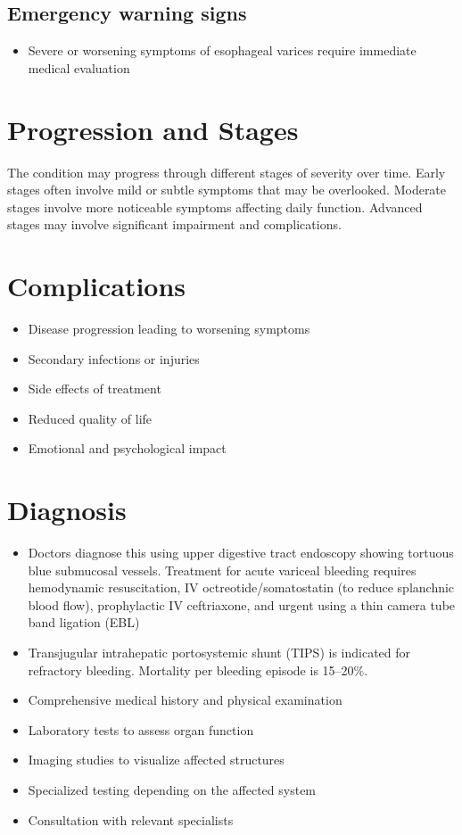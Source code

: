 \subsection{Emergency warning signs}
\begin{itemize}[noitemsep]
  \item Severe or worsening symptoms of esophageal varices require immediate medical evaluation
\end{itemize}
\section{Progression and Stages}
The condition may progress through different stages of severity over time. Early stages often involve mild or subtle symptoms that may be overlooked. Moderate stages involve more noticeable symptoms affecting daily function. Advanced stages may involve significant impairment and complications.
\section{Complications}
\begin{itemize}[noitemsep]
  \item Disease progression leading to worsening symptoms
  \item Secondary infections or injuries
  \item Side effects of treatment
  \item Reduced quality of life
  \item Emotional and psychological impact
\end{itemize}
\section{Diagnosis}
\begin{itemize}[noitemsep]
  \item Doctors diagnose this using upper digestive tract endoscopy showing tortuous blue submucosal vessels. Treatment for acute variceal bleeding requires hemodynamic resuscitation, IV octreotide/somatostatin (to reduce splanchnic blood flow), prophylactic IV ceftriaxone, and urgent using a thin camera tube band ligation (EBL)
  \item Transjugular intrahepatic portosystemic shunt (TIPS) is indicated for refractory bleeding. Mortality per bleeding episode is 15--20\%.
  \item Comprehensive medical history and physical examination
  \item Laboratory tests to assess organ function
  \item Imaging studies to visualize affected structures
  \item Specialized testing depending on the affected system
  \item Consultation with relevant specialists
\end{itemize}
